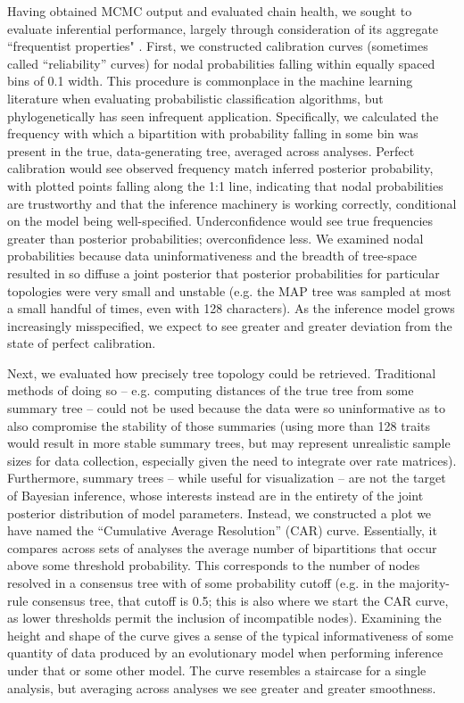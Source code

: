 \documentclass[10pt, twocolumn, twoside]{article}
\begin{document}
Having obtained MCMC output and evaluated chain health, we sought to evaluate inferential performance, largely through consideration of its aggregate ``frequentist properties" \citep[\textit{sensu}][]{huelsenbeckFrequentistPropertiesBayesian2004}. First, we constructed calibration curves (sometimes called “reliability” curves) for nodal probabilities falling within equally spaced bins of 0.1 width. This procedure is commonplace in the machine learning literature when evaluating probabilistic classification algorithms, but phylogenetically has seen infrequent application. Specifically, we calculated the frequency with which a bipartition with probability falling in some bin was present in the true, data-generating tree, averaged across analyses. Perfect calibration would see observed frequency match inferred posterior probability, with plotted points falling along the 1:1 line, indicating that nodal probabilities are trustworthy and that the inference machinery is working correctly, conditional on the model being well-specified. Underconfidence would see true frequencies greater than posterior probabilities; overconfidence less. We examined nodal probabilities because data uninformativeness and the breadth of tree-space resulted in so diffuse a joint posterior that posterior probabilities for particular topologies were very small and unstable (e.g. the MAP tree was sampled at most a small handful of times, even with 128 characters). As the inference model grows increasingly misspecified, we expect to see greater and greater deviation from the state of perfect calibration.

Next, we evaluated how precisely tree topology could be retrieved. Traditional methods of doing so – e.g. computing distances of the true tree from some summary tree – could not be used because the data were so uninformative as to also compromise the stability of those summaries (using more than 128 traits would result in more stable summary trees, but may represent unrealistic sample sizes for data collection, especially given the need to integrate over rate matrices). Furthermore, summary trees – while useful for visualization – are not the target of Bayesian inference, whose interests instead are in the entirety of the joint posterior distribution of model parameters. Instead, we constructed a plot we have named the “Cumulative Average Resolution” (CAR) curve. Essentially, it compares across sets of analyses the average number of bipartitions that occur above some threshold probability. This corresponds to the number of nodes resolved in a consensus tree with of some probability cutoff (e.g. in the majority-rule consensus tree, that cutoff is 0.5; this is also where we start the CAR curve, as lower thresholds permit the inclusion of incompatible nodes). Examining the height and shape of the curve gives a sense of the typical informativeness of some quantity of data produced by an evolutionary model when performing inference under that or some other model. The curve resembles a staircase for a single analysis, but averaging across analyses we see greater and greater smoothness.
\end{document}
